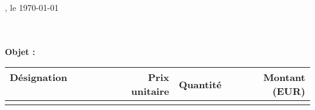 \usepackage[plainpages=false,
    pdfcenterwindow=true,
    pdftoolbar=false,
    pdfmenubar=false,
    pdfauthor={\Denomination},
    pdftitle={Facture \FactureNum\ -- \Denomination},
    pdfsubject={Facture \FactureNum},
    pdfkeywords={},
    pdfproducer={Latex with hyperref},
    pdfcreator={pdflatex},
    linkcolor=black,
    citecolor=black,
    filecolor=black,
    urlcolor=black]{hyperref}
    
\geometry{verbose,tmargin=4em,bmargin=8em,lmargin=6em,rmargin=6em}
\setlength{\parindent}{0pt}
\setlength{\parskip}{1ex plus 0.5ex minus 0.2ex}

\thispagestyle{fancy}
\pagestyle{fancy}
\setlength{\parindent}{0pt}

\renewcommand{\headrulewidth}{0pt}




\makeheader{}

\hspace*{10.5cm}
\begin{infoSection}
\end{infoSection}

\hspace*{10.5cm}
\FactureLieu, le \today

~\\~\\

\textbf{Objet : \FactureObjet \\}

\textnormal{\FactureDescr}
\vspace{10mm}

\begin{center}
	\begin{tabular}{lrrr}
		\textbf{\itemizationHeaderStyle Désignation ~~~~~~}	& \textbf{\itemizationHeaderStyle Prix unitaire}	& \textbf{\itemizationHeaderStyle Quantité}	& \textbf{\itemizationHeaderStyle Montant (EUR)}	\\
		\midrule
		\AfficheResultat{}
	\end{tabular}
\end{center}

